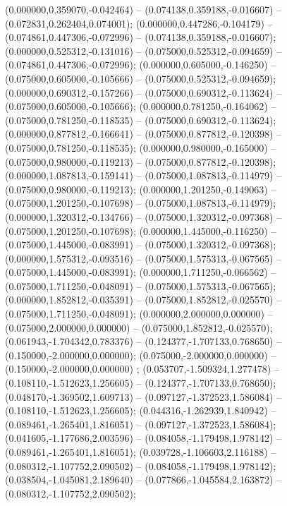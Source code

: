  (0.000000,0.359070,-0.042464) -- (0.074138,0.359188,-0.016607) -- (0.072831,0.262404,0.074001);
 (0.000000,0.447286,-0.104179) -- (0.074861,0.447306,-0.072996) -- (0.074138,0.359188,-0.016607);
 (0.000000,0.525312,-0.131016) -- (0.075000,0.525312,-0.094659) -- (0.074861,0.447306,-0.072996);
 (0.000000,0.605000,-0.146250) -- (0.075000,0.605000,-0.105666) -- (0.075000,0.525312,-0.094659);
 (0.000000,0.690312,-0.157266) -- (0.075000,0.690312,-0.113624) -- (0.075000,0.605000,-0.105666);
 (0.000000,0.781250,-0.164062) -- (0.075000,0.781250,-0.118535) -- (0.075000,0.690312,-0.113624);
 (0.000000,0.877812,-0.166641) -- (0.075000,0.877812,-0.120398) -- (0.075000,0.781250,-0.118535);
 (0.000000,0.980000,-0.165000) -- (0.075000,0.980000,-0.119213) -- (0.075000,0.877812,-0.120398);
 (0.000000,1.087813,-0.159141) -- (0.075000,1.087813,-0.114979) -- (0.075000,0.980000,-0.119213);
 (0.000000,1.201250,-0.149063) -- (0.075000,1.201250,-0.107698) -- (0.075000,1.087813,-0.114979);
 (0.000000,1.320312,-0.134766) -- (0.075000,1.320312,-0.097368) -- (0.075000,1.201250,-0.107698);
 (0.000000,1.445000,-0.116250) -- (0.075000,1.445000,-0.083991) -- (0.075000,1.320312,-0.097368);
 (0.000000,1.575312,-0.093516) -- (0.075000,1.575313,-0.067565) -- (0.075000,1.445000,-0.083991);
 (0.000000,1.711250,-0.066562) -- (0.075000,1.711250,-0.048091) -- (0.075000,1.575313,-0.067565);
 (0.000000,1.852812,-0.035391) -- (0.075000,1.852812,-0.025570) -- (0.075000,1.711250,-0.048091);
 (0.000000,2.000000,0.000000) -- (0.075000,2.000000,0.000000) -- (0.075000,1.852812,-0.025570);
 (0.061943,-1.704342,0.783376) -- (0.124377,-1.707133,0.768650) -- (0.150000,-2.000000,0.000000);
 (0.075000,-2.000000,0.000000) -- (0.150000,-2.000000,0.000000) ;
 (0.053707,-1.509324,1.277478) -- (0.108110,-1.512623,1.256605) -- (0.124377,-1.707133,0.768650);
 (0.048170,-1.369502,1.609713) -- (0.097127,-1.372523,1.586084) -- (0.108110,-1.512623,1.256605);
 (0.044316,-1.262939,1.840942) -- (0.089461,-1.265401,1.816051) -- (0.097127,-1.372523,1.586084);
 (0.041605,-1.177686,2.003596) -- (0.084058,-1.179498,1.978142) -- (0.089461,-1.265401,1.816051);
 (0.039728,-1.106603,2.116188) -- (0.080312,-1.107752,2.090502) -- (0.084058,-1.179498,1.978142);
 (0.038504,-1.045081,2.189640) -- (0.077866,-1.045584,2.163872) -- (0.080312,-1.107752,2.090502);

